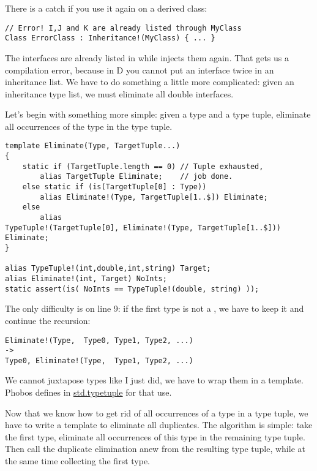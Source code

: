 There is a catch if you use it again on a derived class:

\begin{verbatim}
// Error! I,J and K are already listed through MyClass
Class ErrorClass : Inheritance!(MyClass) { ... }
\end{verbatim}

The interfaces are already listed in  while  injects them again. That gets us a compilation error, because in D you cannot put an interface twice in an inheritance list. We have to do something a little more complicated: given an inheritance type list, we must eliminate all double interfaces.

Let's begin with something more simple: given a type and a type tuple, eliminate all occurrences of the type in the type tuple.

\begin{verbatim}
template Eliminate(Type, TargetTuple...)
{
    static if (TargetTuple.length == 0) // Tuple exhausted,
        alias TargetTuple Eliminate;    // job done.
    else static if (is(TargetTuple[0] : Type))
        alias Eliminate!(Type, TargetTuple[1..$]) Eliminate;
    else
        alias 
TypeTuple!(TargetTuple[0], Eliminate!(Type, TargetTuple[1..$])) Eliminate;
}

alias TypeTuple!(int,double,int,string) Target;
alias Eliminate!(int, Target) NoInts;
static assert(is( NoInts == TypeTuple!(double, string) ));
\end{verbatim}

The only difficulty is on line 9: if the first type is not a , we have to keep it and continue the recursion:

\begin{verbatim}
Eliminate!(Type,  Type0, Type1, Type2, ...)
->
Type0, Eliminate!(Type,  Type1, Type2, ...)
\end{verbatim}

We cannot juxtapose types like I just did, we have to wrap them in a template. Phobos defines  in \href{www.d-programming-language.org/phobos/std_typetuple.html}{std.typetuple} for that use.

Now that we know how to get rid of all occurrences of a type in a type tuple, we have to write a template to eliminate all duplicates. The algorithm is simple: take the first type, eliminate all occurrences of this type in the remaining type tuple. Then call the duplicate elimination anew from the resulting type tuple, while at the same time collecting the first type.

